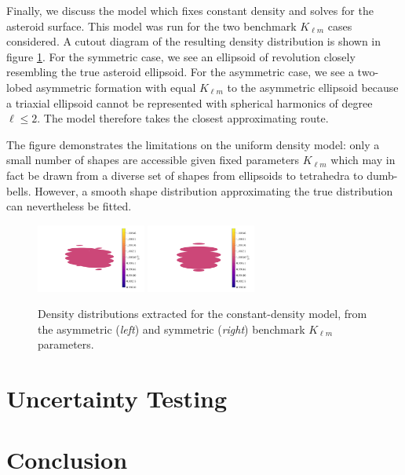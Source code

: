 \documentclass{aastex631}
\begin{document}
Finally, we discuss the model which fixes constant density and solves for the asteroid surface. This model was run for the two benchmark $K_{\ell m}$ cases considered. A cutout diagram of the resulting density distribution is shown in figure \ref{fig:surface-density-distro}. For the symmetric case, we see an ellipsoid of revolution closely resembling the true asteroid ellipsoid. For the asymmetric case, we see a two-lobed asymmetric formation with equal $K_{\ell m}$ to the asymmetric ellipsoid because a triaxial ellipsoid cannot be represented with spherical harmonics of degree $\ell \leq 2$. The model therefore takes the closest approximating route.

The figure demonstrates the limitations on the uniform density model: only a small number of shapes are accessible given fixed parameters $K_{\ell m}$ which may in fact be drawn from a diverse set of shapes from ellipsoids to tetrahedra to dumb-bells. However, a smooth shape distribution approximating the true distribution can nevertheless be fitted.

\begin{figure}
  \centering
  \includegraphics[width=0.32\textwidth]{surface-asym.pdf}
  \includegraphics[width=0.32\textwidth]{surface-sym.pdf}
  \caption{Density distributions extracted for the constant-density model, from the asymmetric (\textit{left}) and symmetric (\textit{right}) benchmark $K_{\ell m}$ parameters.}
  \label{fig:surface-density-distro}
\end{figure}



\section{Uncertainty Testing}


\section{Conclusion}
\end{document}

